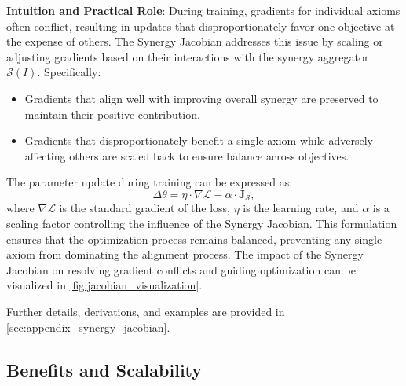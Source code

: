\textbf{Intuition and Practical Role}: During training, gradients for individual axioms often conflict, resulting in updates that disproportionately favor one objective at the expense of others. The Synergy Jacobian addresses this issue by scaling or adjusting gradients based on their interactions with the synergy aggregator \(\mathcal{S}(I)\). Specifically:
\begin{itemize}
    \item Gradients that align well with improving overall synergy are preserved to maintain their positive contribution.
    \item Gradients that disproportionately benefit a single axiom while adversely affecting others are scaled back to ensure balance across objectives.
\end{itemize}

The parameter update during training can be expressed as:
\[
\Delta \theta = \eta \cdot \nabla \mathcal{L} - \alpha \cdot \mathbf{J}_{\mathcal{S}},
\]
where \(\nabla \mathcal{L}\) is the standard gradient of the loss, \(\eta\) is the learning rate, and \(\alpha\) is a scaling factor controlling the influence of the Synergy Jacobian. This formulation ensures that the optimization process remains balanced, preventing any single axiom from dominating the alignment process. The impact of the Synergy Jacobian on resolving gradient conflicts and guiding optimization can be visualized in \cref{fig:jacobian_visualization}.



Further details, derivations, and examples are provided in \cref{sec:appendix_synergy_jacobian}.







\subsection*{Benefits and Scalability}

